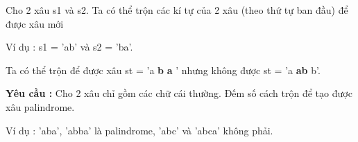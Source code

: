 Cho 2 xâu s1 và s2. Ta có thể trộn các kí tự của 2 xâu (theo thứ tự ban đầu) để được xâu mới

Ví dụ : s1 = 'ab' và s2 = 'ba'.

Ta có thể trộn để được xâu st = 'a\textbf{ b }\textbf{ a } ' nhưng không được st = 'a\textbf{ ab }b'.

\textbf{Yêu cầu : } Cho 2 xâu chỉ gồm các chữ cái thường. Đếm số cách trộn để tạo được xâu palindrome.

Ví dụ : 'aba', 'abba' là palindrome, 'abc' và 'abca' không phải.

\